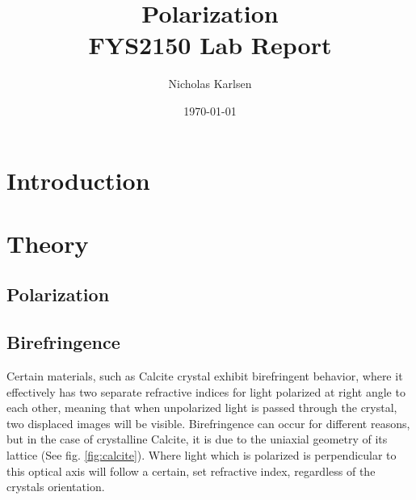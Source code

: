 \documentclass[11pt,a4paper, twocolumn]{article}
\begin{document}
\title{Polarization\\
\normalsize{FYS2150 Lab Report}\\}

\author{Nicholas Karlsen}

\date{\today}%



\section{\label{sect:intro}Introduction}
  

\section{\label{sect:theory}Theory}
  
  \subsection{Polarization}
    

  \subsection{Birefringence}
    Certain materials, such as Calcite crystal exhibit birefringent behavior, where it effectively has two separate refractive indices for light polarized at right angle to each other, meaning that when unpolarized light is passed through the crystal, two displaced images will be visible. Birefringence can occur for different reasons, but in the case of crystalline Calcite, it is due to the uniaxial geometry of its lattice (See fig. \ref{fig:calcite}). Where light which is polarized is perpendicular to this optical axis will follow a certain, set refractive index, regardless of the crystals orientation. 
\end{document}
